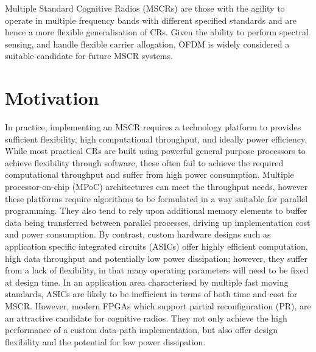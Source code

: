Multiple Standard Cognitive Radios (MSCRs) are those with the agility to operate in multiple frequency bands with different specified standards and are hence a more flexible generalisation of CRs. %
Given the ability to perform spectral sensing, and handle flexible carrier allogation, OFDM is widely considered a suitable candidate for future MSCR systems.

\section{Motivation}

In practice, implementing an MSCR requires a technology platform to provides sufficient flexibility, high computational throughput, and ideally power efficiency.
While most practical CRs are built using powerful general purpose processors to achieve flexibility through software, these often fail to achieve the required computational throughput and suffer from high power consumption.
Multiple processor-on-chip (MPoC) architectures can meet the throughput needs, however these platforms require algorithms to be formulated in a way suitable for parallel programming. 
They also tend to rely upon additional memory elements to buffer data being transferred between parallel processes, driving up implementation cost and power consumption.
By contrast, custom hardware designs such as application specific integrated circuits (ASICs) offer highly efficient computation, high data throughput and potentially low power dissipation; however, they suffer from a lack of flexibility, in that many operating parameters will need to be fixed at design time.
In an application area characterised by multiple fast moving standards, ASICs are likely to be inefficient in terms of both time and cost for MSCR.
However, modern FPGAs which support partial reconfiguration (PR), are an attractive candidate for cognitive radios.
They not only achieve the high performance of a custom data-path implementation, but also offer design flexibility and the potential for low power dissipation.

